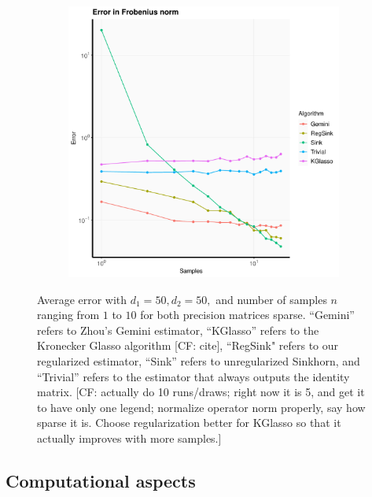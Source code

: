 \documentclass[aos]{imsart}
\theoremstyle{definition}
\numberwithin{equation}{section}
\newcommand{\CF}[1]{{\color{purple}[CF: #1]}}
\begin{document}
\begin{figure}
\begin{subfigure}[b]{0.3\textwidth}
     \end{subfigure}
     \hfill
     \begin{subfigure}[b]{0.3\textwidth}
         \centering
         \includegraphics[width=\textwidth]{./code/zhou-comparison/25-50-lc-frob.pdf}
     \end{subfigure}
\caption{Average error with $d_1 = 50, d_2 = 50, $ and number of samples $n$ ranging from $1$ to $10$ for both precision matrices sparse. ``Gemini'' refers to Zhou's Gemini estimator, ``KGlasso'' refers to the Kronecker Glasso algorithm \CF{cite}, ``RegSink" refers to our regularized estimator, ``Sink'' refers to unregularized Sinkhorn, and ``Trivial'' refers to the estimator that always outputs the identity matrix. \CF{actually do 10 runs/draws; right now it is 5, and get it to have only one legend; normalize operator norm properly, say how sparse it is. Choose regularization better for KGlasso so that it actually improves with more samples.}}\label{fig:lc}
\end{figure}

\subsection{Computational aspects}
\end{document}
